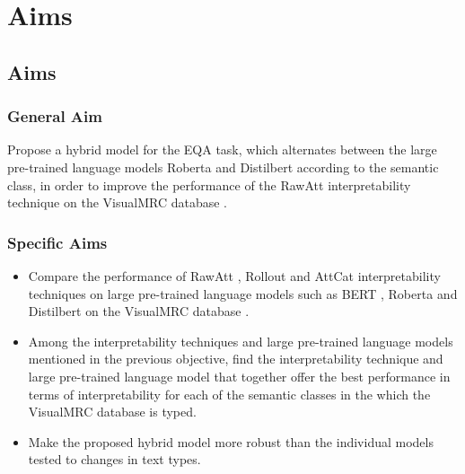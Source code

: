 \chapter{Aims}

\section{Aims}\label{sec:objectives}

\subsection{General Aim}



Propose a hybrid model for the EQA task, which alternates between the large pre-trained language models Roberta \cite{liu2019roberta} and Distilbert \cite{sanh2019distilbert} according to the semantic class, in order to improve the performance of the RawAtt \cite{abnar2020quantifying} interpretability technique on the VisualMRC database \cite{tanaka2021visualmrc}.

\subsection{Specific Aims}

    \begin{itemize}


         \item Compare the performance of RawAtt \cite{abnar2020quantifying}, Rollout \cite{abnar2020quantifying} and AttCat \cite{qiang2022attcat} interpretability techniques on large pre-trained language models such as BERT \cite{devlin2018bert}, Roberta \cite{liu2019roberta} and Distilbert \cite{sanh2019distilbert} on the VisualMRC database \cite{tanaka2021visualmrc}.

        \item Among the interpretability techniques and large pre-trained language models mentioned in the previous objective, find the interpretability technique and large pre-trained language model that together offer the best performance in terms of interpretability for each of the semantic classes in the which the VisualMRC database \cite{tanaka2021visualmrc} is typed.

        \item Make the proposed hybrid model more robust than the individual models tested to changes in text types.

    \end{itemize}